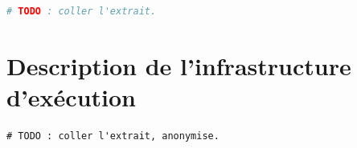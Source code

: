 \begin{lstlisting}[language=yaml,caption={Fichiers de configuration déclarative
  de la construction embarquée}]
# TODO : coller l'extrait.
\end{lstlisting}

\section{Description de l'infrastructure d'exécution}
\label{ann:terraform}

\begin{lstlisting}[language=hcl,caption={Extrait de la description
  d'infrastructure}]
# TODO : coller l'extrait, anonymise.
\end{lstlisting}
